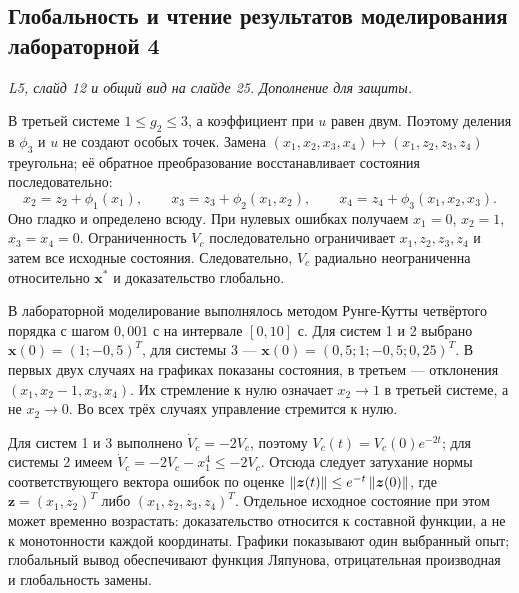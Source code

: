 \subsection{Глобальность и чтение результатов моделирования лабораторной 4}
\textit{L5, слайд 12 и общий вид на слайде 25.
Дополнение для защиты.}

В третьей системе $1\le g_2\le3$, а коэффициент при $u$ равен двум.
Поэтому деления в $\phi_3$ и $u$ не создают особых точек.
Замена $(x_1,x_2,x_3,x_4)\mapsto(x_1,z_2,z_3,z_4)$ треугольна;
её обратное преобразование восстанавливает состояния последовательно:
\[
  x_2=z_2+\phi_1(x_1),\qquad
  x_3=z_3+\phi_2(x_1,x_2),\qquad
  x_4=z_4+\phi_3(x_1,x_2,x_3).
\]
Оно гладко и определено всюду. При нулевых ошибках получаем
$x_1=0$, $x_2=1$, $x_3=x_4=0$.
Ограниченность $V_c$ последовательно ограничивает $x_1,z_2,z_3,z_4$
и затем все исходные состояния. Следовательно, $V_c$ радиально
неограниченна относительно $\bm x^*$ и доказательство глобально.

В лабораторной моделирование выполнялось методом Рунге-Кутты
четвёртого порядка с шагом $0{,}001$ с на интервале $[0,10]$ с.
Для систем 1 и 2 выбрано $\bm x(0)=(1;-0{,}5)^T$,
для системы 3 --- $\bm x(0)=(0{,}5;1;-0{,}5;0{,}25)^T$.
В первых двух случаях на графиках показаны состояния,
в третьем --- отклонения $(x_1,x_2-1,x_3,x_4)$.
Их стремление к нулю означает $x_2\to1$ в третьей системе,
а не $x_2\to0$. Во всех трёх случаях управление стремится к нулю.

Для систем 1 и 3 выполнено $\dot V_c=-2V_c$, поэтому
$V_c(t)=V_c(0)e^{-2t}$; для системы 2 имеем
$\dot V_c=-2V_c-x_1^4\le-2V_c$.
Отсюда следует затухание нормы соответствующего вектора ошибок
по оценке $\left\lVert\bm z(t)\right\rVert\le e^{-t}\left\lVert\bm z(0)\right\rVert$,
где $\bm z=(x_1,z_2)^T$ либо $(x_1,z_2,z_3,z_4)^T$.
Отдельное исходное состояние при этом может
временно возрастать: доказательство относится к составной функции,
а не к монотонности каждой координаты.
Графики показывают один выбранный опыт; глобальный вывод обеспечивают
функция Ляпунова, отрицательная производная и глобальность замены.

